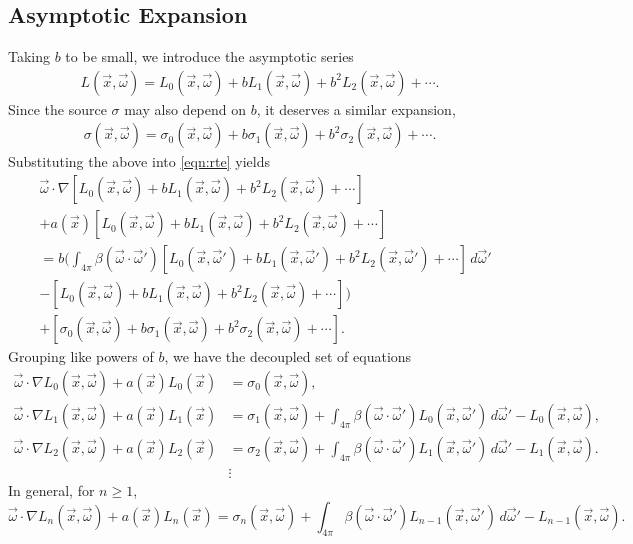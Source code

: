 \subsection{Asymptotic Expansion}
Taking $b$ to be small, we introduce the asymptotic series
\newcommand{\Lasym}{L_0(\vec{x},\vec{\omega}) + b L_1(\vec{x},\vec{\omega}) + b^2 L_2(\vec{x},\vec{\omega}) + \cdots}
\newcommand{\Lasyms}{L_0(\vec{x_s},\vec{\omega}) + b L_1(\vec{x_s},\vec{\omega}) + b^2 L_2(\vec{x_s},\vec{\omega}) + \cdots}
\newcommand{\Lasymb}{L_0(\vec{x_b},\vec{\omega}) + b L_1(\vec{x_b},\vec{\omega}) + b^2 L_2(\vec{x_b},\vec{\omega}) + \cdots}
\newcommand{\Lasymp}{L_0(\vec{x},\vec{\omega}') + b L_1(\vec{x},\vec{\omega}') + b^2 L_2(\vec{x},\vec{\omega}') + \cdots}
\newcommand{\sigasym}{\sigma_0(\vec{x},\vec{\omega}) + b \sigma_1(\vec{x},\vec{\omega}) + b^2 \sigma_2(\vec{x},\vec{\omega}) + \cdots}
\begin{align*}
  L(\vec{x},\vec{\omega}) = \Lasym.
\end{align*}
Since the source $\sigma$ may also depend on $b$, it deserves a similar expansion,
\begin{align*}
  \sigma(\vec{x},\vec{\omega}) = \sigasym.
\end{align*}
Substituting the above into \eqref{eqn:rte} yields
\begin{align*}
    &\vec{\omega} \cdot \nabla \left[ \Lasym \right] \\
    &+ a(\vec{x}) \left[ \Lasym \right] \\
    &= b\Bigg(
      \int_{4\pi} \beta(\vec{\omega}\cdot\vec{\omega}')
      \left[ \Lasymp \right] \, d\vec{\omega}' \\
    &- \left[ \Lasym \right]
      \Bigg) \\
    &+ \left[ \sigasym \right].
\end{align*}
Grouping like powers of $b$, we have the decoupled set of equations
\begin{align}
  \vec{\omega} \cdot \nabla L_0(\vec{x}, \vec{\omega}) + a(\vec{x})L_0(\vec{x}) &= \sigma_0(\vec{x}, \vec{\omega}),
  \label{eqn:asymptotics_0}\\
  \vec{\omega} \cdot \nabla L_1(\vec{x}, \vec{\omega}) + a(\vec{x})L_1(\vec{x})
  &= \sigma_1(\vec{x}, \vec{\omega})
  + \int_{4\pi} \beta(\vec{\omega}\cdot\vec{\omega}') L_0(\vec{x}, \vec{\omega}')\,d\vec{\omega}' - L_0(\vec{x}, \vec{\omega}), \nonumber\\
  \vec{\omega} \cdot \nabla L_2(\vec{x}, \vec{\omega}) + a(\vec{x})L_2(\vec{x})
  &= \sigma_2(\vec{x}, \vec{\omega})
  + \int_{4\pi} \beta(\vec{\omega}\cdot\vec{\omega}') L_1(\vec{x}, \vec{\omega}')\,d\vec{\omega}' - L_1(\vec{x}, \vec{\omega}). \nonumber \\
  &\vdots \nonumber
\end{align}
In general, for $n \geq 1$,
\begin{equation}
  \vec{\omega} \cdot \nabla L_n(\vec{x}, \vec{\omega}) + a(\vec{x})L_n(\vec{x})
  = \sigma_n(\vec{x}, \vec{\omega})
  + \int_{4\pi} \beta(\vec{\omega}\cdot\vec{\omega}') L_{n-1}(\vec{x}, \vec{\omega}')\,d\vec{\omega}' - L_{n-1}(\vec{x}, \vec{\omega}).
  \label{eqn:asymptotics_n}
\end{equation}

